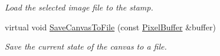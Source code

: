 \begin{DoxyCompactItemize}
\begin{DoxyCompactList}\small\item\em Load the selected image file to the stamp. \end{DoxyCompactList}\item 
virtual void \hyperlink{classimage__tools_1_1IOManager_acf47f54c83d9df771342b2fb6891dad2}{Save\+Canvas\+To\+File} (const \hyperlink{classimage__tools_1_1PixelBuffer}{Pixel\+Buffer} \&buffer)\hypertarget{classimage__tools_1_1IOManager_acf47f54c83d9df771342b2fb6891dad2}{}\label{classimage__tools_1_1IOManager_acf47f54c83d9df771342b2fb6891dad2}

\begin{DoxyCompactList}\small\item\em Save the current state of the canvas to a file. \end{DoxyCompactList}\end{DoxyCompactItemize}
